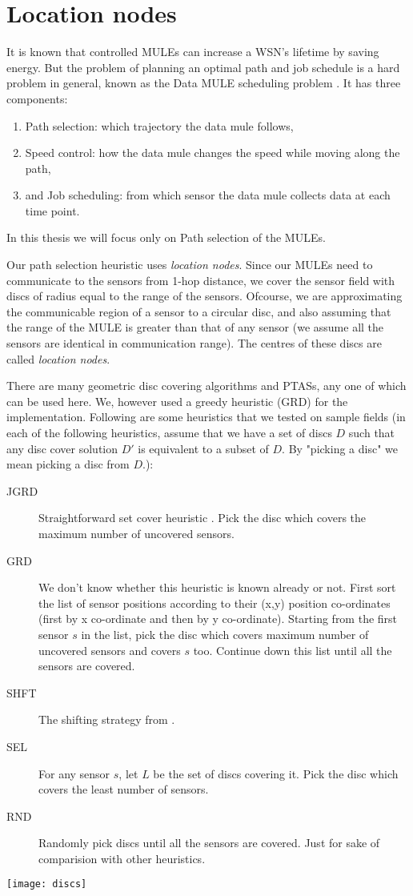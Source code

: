 \chapter{Location nodes}
\label{chap:location_nodes}

It is known that controlled MULEs can increase a WSN's lifetime by saving energy. But the problem of planning an optimal path and job schedule is a hard problem in general, known as the Data MULE scheduling problem \cite{dms}. It has three components:
\begin{enumerate}
\item Path selection: which trajectory the data mule follows,
\item Speed control: how the data mule changes the speed while moving along the path,
\item and Job scheduling: from which sensor the data mule collects data at each time point.
\end{enumerate}
In this thesis we will focus only on Path selection of the MULEs.

Our path selection heuristic uses \emph{location nodes}. Since our MULEs need to communicate to  the sensors from 1-hop distance, we cover the sensor field with discs of radius equal to the range of the sensors. Ofcourse, we are approximating the communicable region of a sensor to a circular disc, and also assuming that the range of the MULE is greater than that of any sensor (we assume all the sensors are identical in communication range). The centres of these discs are called \emph{location nodes}.

There are many \cite{gmdc} \cite{dudc} \cite{shifting} geometric disc covering algorithms and PTASs, any one of which can be used here. We, however used a greedy heuristic (GRD) for the implementation. Following are some heuristics that we tested on sample fields (in each of the following heuristics, assume that we have a set of discs $D$ such that any disc cover solution $D'$ is equivalent to a subset of $D$. By "picking a disc" we mean picking a disc from $D$.):
\begin{description}
\item[JGRD] Straightforward set cover heuristic \cite{jgreedy}. Pick the disc which covers the maximum number of uncovered sensors.
\item[GRD] We don't know whether this heuristic is known already or not. First sort the list of sensor positions according to their (x,y) position co-ordinates (first by x co-ordinate and then by y co-ordinate). Starting from the first sensor $s$ in the list, pick the disc which covers maximum number of uncovered sensors and covers $s$ too. Continue down this list until all the sensors are covered.
\item[SHFT] The shifting strategy from \cite{shifting}.
\item[SEL] For any sensor $s$, let $L$ be the set of discs covering it. Pick the disc which covers the least number of sensors.
\item[RND] Randomly pick discs until all the sensors are covered. Just for sake of comparision with other heuristics.
\end{description}

\texttt{[image: discs]}